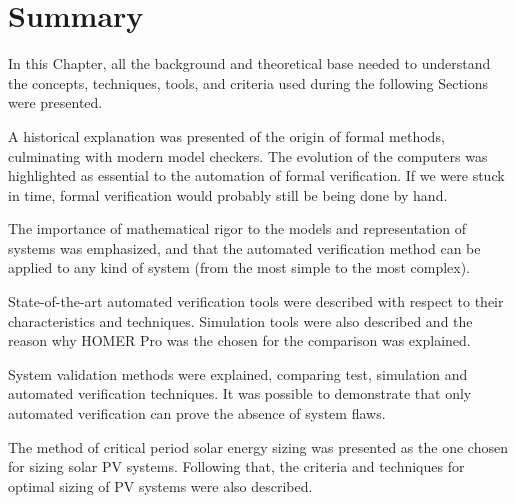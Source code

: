\section{Summary}

In this Chapter, all the background and theoretical base needed to understand the concepts, techniques, tools, and criteria used during the following Sections were presented.

A historical explanation was presented of the origin of formal methods, culminating with modern model checkers. The evolution of the computers was highlighted as essential to the automation of formal verification. If we were stuck in time, formal verification would probably still be being done by hand.

The importance of mathematical rigor to the models and representation of systems was emphasized, and that the automated verification method can be applied to any kind of system (from the most simple to the most complex).

State-of-the-art automated verification tools were described with respect to their characteristics and techniques. Simulation tools were also described and the reason why HOMER Pro was the chosen for the comparison was explained.

System validation methods were explained, comparing test, simulation and automated verification techniques. It was possible to demonstrate that only automated verification can prove the absence of system flaws.

The method of critical period solar energy sizing was presented as the one chosen for sizing solar PV systems. Following that, the criteria and techniques for optimal sizing of PV systems were also described.

